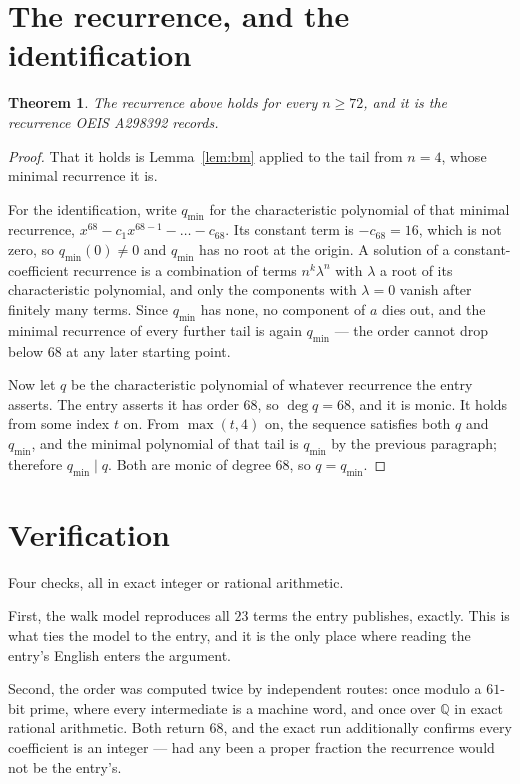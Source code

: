 \documentclass[11pt,a4paper]{article}
\theoremstyle{plain}
\newtheorem{theorem}{Theorem}
\theoremstyle{definition}
\begin{document}
\section{The recurrence, and the identification}

\begin{theorem}
The recurrence above holds for every $n\ge72$, and it is the recurrence OEIS A298392 records.
\end{theorem}

\begin{proof}
That it holds is Lemma~\ref{lem:bm} applied to the tail from $n=4$, whose minimal
recurrence it is.

For the identification, write $q_{\min}$ for the characteristic polynomial of that minimal
recurrence, $x^{68}-c_1x^{68-1}-\dots-c_{68}$. Its constant term is
$-c_{68}=16$, which is not zero, so $q_{\min}(0)\neq0$ and $q_{\min}$ has no
root at the origin. A solution of a constant-coefficient recurrence is a combination of terms
$n^{k}\lambda^{n}$ with $\lambda$ a root of its characteristic polynomial, and only the
components with $\lambda=0$ vanish after finitely many terms. Since $q_{\min}$ has none, no
component of $a$ dies out, and the minimal recurrence of every further tail is again
$q_{\min}$ --- the order cannot drop below $68$ at any later starting point.

Now let $q$ be the characteristic polynomial of whatever recurrence the entry asserts. The
entry asserts it has order $68$, so $\deg q=68$, and it is monic. It holds from some
index $t$ on. From $\max(t,4)$ on, the sequence satisfies both $q$ and $q_{\min}$, and
the minimal polynomial of that tail is $q_{\min}$ by the previous paragraph; therefore
$q_{\min}\mid q$. Both are monic of degree $68$, so $q=q_{\min}$.
\end{proof}

\section{Verification}

Four checks, all in exact integer or rational arithmetic.

First, the walk model reproduces all $23$ terms the entry publishes, exactly. This is
what ties the model to the entry, and it is the only place where reading the entry's English
enters the argument.

Second, the order was computed twice by independent routes: once modulo a $61$-bit prime, where
every intermediate is a machine word, and once over $\mathbb{Q}$ in exact rational arithmetic.
Both return $68$, and the exact run additionally confirms every coefficient is an integer
--- had any been a proper fraction the recurrence would not be the entry's.
\end{document}

